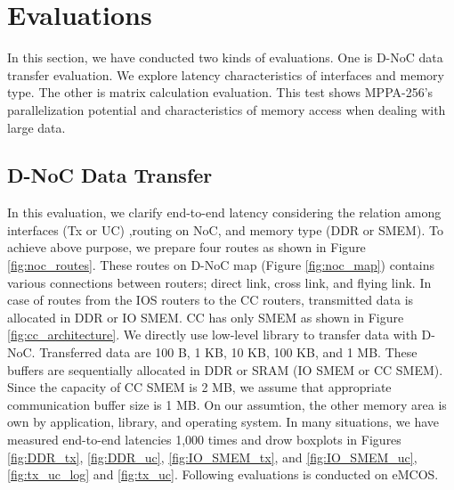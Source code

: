 \documentclass{sig-alternate-05-2015}
\begin{document}

\section{Evaluations}
\label{sec:evaluations}
In this section, we have conducted two kinds of evaluations.
One is D-NoC data transfer evaluation.
We explore latency characteristics of interfaces and memory type.
The other is matrix calculation evaluation.
This test shows MPPA-256's parallelization potential and characteristics of memory access when dealing with large data.

\subsection{D-NoC Data Transfer}
\label{sec:dnoc_eval}
In this evaluation, we clarify end-to-end latency considering the relation among interfaces (Tx or UC) ,routing on NoC, and memory type (DDR or SMEM).
To achieve above purpose, we prepare four routes as shown in Figure \ref{fig:noc_routes}.
These routes on D-NoC map (Figure \ref{fig:noc_map}) contains various connections between routers; direct link, cross link, and flying link.
In case of routes from the IOS routers to the CC routers, transmitted data is allocated in DDR or IO SMEM.
CC has only SMEM as shown in Figure \ref{fig:cc_architecture}.
We directly use low-level library to transfer data with D-NoC.
Transferred data are 100 B, 1 KB, 10 KB, 100 KB, and 1 MB.
These buffers are sequentially allocated in DDR or SRAM (IO SMEM or CC SMEM).
Since the capacity of CC SMEM is 2 MB, we assume that appropriate communication buffer size is 1 MB.
On our assumtion, the other memory area is own by application, library, and operating system.
In many situations, we have measured end-to-end latencies 1,000 times and drow boxplots 
in Figures \ref{fig:DDR_tx}, \ref{fig:DDR_uc}, \ref{fig:IO_SMEM_tx}, and \ref{fig:IO_SMEM_uc}, \ref{fig:tx_uc_log} and \ref{fig:tx_uc}.
Following evaluations is conducted on eMCOS.
\end{document}
